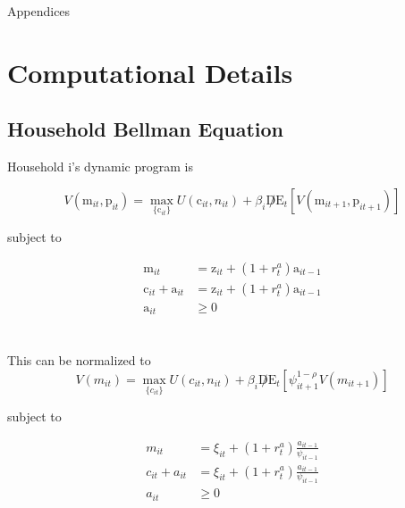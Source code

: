 \documentclass[titlepage]{\econtex}\providecommand{\texname}{BufferStockTheory}
\providecommand{\FigDir}{Figures}
\begin{document}


\clearpage\vfill\eject

\appendix

\centerline{\LARGE Appendices}\vspace{0.2in}




\clearpage\vfill\eject

\normalsize


\hypertarget{Computational Details}{}
\section{Computational Details}

\hypertarget{Household Bellman Equation }{}
\subsection{Household Bellman Equation}

Household i's dynamic program is

$$ V(\pmb{\mathrm{m}}_{it},\pmb{\mathrm{p}}_{it})=\max_{\{ \pmb{\mathrm{c}}_{it}\}} { U( \pmb{\mathrm{c}}_{it}, n_{it}) + \beta_{i} \not D \mathrm{E}_{t}[V( \pmb{\mathrm{m}}_{it+1} , \pmb{\mathrm{p}}_{it+1})]}$$

subject to 

\begin{align*}
 \pmb{\mathrm{m}}_{i t} & = \pmb{\mathrm{z}}_{i t}  + (1+\mathit{r}^{a}_{t})\pmb{\mathrm{a}}_{i t-1} \\
 \pmb{\mathrm{c}}_{i t}  + \pmb{\mathrm{a}}_{i t} &= \pmb{\mathrm{z}}_{i t}  + (1+\mathit{r}^{a}_{t}) \pmb{\mathrm{a}}_{i t-1}   \\
\pmb{\mathrm{a}}_{it} &\geq 0 
\end{align*} \\ \\

This can be normalized to \\


$$ V(m_{it}) = \max_{\{c_{it}\}} { U(c_{it}, n_{it}) + \beta_{i}\not D \mathrm{E}_{t}[\psi_{it+1}^{1-\rho} V(m_{it+1})]}$$

 subject to 
 
 \begin{align*}
m_{i t} &=  \xi_{it}  + (1+r^{a}_{t}) \frac{a_{i t-1}}{\psi_{it-1}} \\
 c_{i t}  + a_{i t} &= \xi_{it}  + (1+r^{a}_{t}) \frac{a_{i t-1}}{\psi_{it-1}} \\
 a_{it} &\geq 0 
 \end{align*}
 
\end{document}
